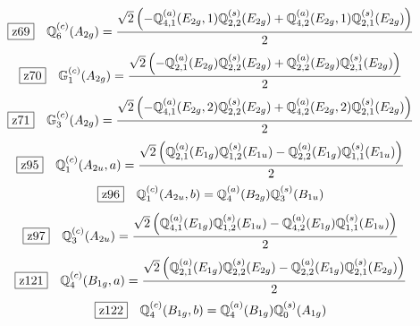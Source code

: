 \documentclass[fleqn,10pt,landscape]{jsarticle}
\begin{document}
\begin{dmath*}
\hspace*{3mm}\fbox{z69}\quad \mathbb{Q}_{6}^{(c)}(A_{2g})=\frac{\sqrt{2} \left(- \mathbb{Q}_{4,1}^{(a)}(E_{2g},1) \mathbb{Q}_{2,2}^{(s)}(E_{2g}) + \mathbb{Q}_{4,2}^{(a)}(E_{2g},1) \mathbb{Q}_{2,1}^{(s)}(E_{2g})\right)}{2}
\end{dmath*}
\begin{dmath*}
\hspace*{3mm}\fbox{z70}\quad \mathbb{G}_{1}^{(c)}(A_{2g})=\frac{\sqrt{2} \left(- \mathbb{Q}_{2,1}^{(a)}(E_{2g}) \mathbb{Q}_{2,2}^{(s)}(E_{2g}) + \mathbb{Q}_{2,2}^{(a)}(E_{2g}) \mathbb{Q}_{2,1}^{(s)}(E_{2g})\right)}{2}
\end{dmath*}
\begin{dmath*}
\hspace*{3mm}\fbox{z71}\quad \mathbb{G}_{3}^{(c)}(A_{2g})=\frac{\sqrt{2} \left(- \mathbb{Q}_{4,1}^{(a)}(E_{2g},2) \mathbb{Q}_{2,2}^{(s)}(E_{2g}) + \mathbb{Q}_{4,2}^{(a)}(E_{2g},2) \mathbb{Q}_{2,1}^{(s)}(E_{2g})\right)}{2}
\end{dmath*}
\begin{dmath*}
\hspace*{3mm}\fbox{z95}\quad \mathbb{Q}_{1}^{(c)}(A_{2u},a)=\frac{\sqrt{2} \left(\mathbb{Q}_{2,1}^{(a)}(E_{1g}) \mathbb{Q}_{1,2}^{(s)}(E_{1u}) - \mathbb{Q}_{2,2}^{(a)}(E_{1g}) \mathbb{Q}_{1,1}^{(s)}(E_{1u})\right)}{2}
\end{dmath*}
\begin{dmath*}
\hspace*{3mm}\fbox{z96}\quad \mathbb{Q}_{1}^{(c)}(A_{2u},b)=\mathbb{Q}_{4}^{(a)}(B_{2g}) \mathbb{Q}_{3}^{(s)}(B_{1u})
\end{dmath*}
\begin{dmath*}
\hspace*{3mm}\fbox{z97}\quad \mathbb{Q}_{3}^{(c)}(A_{2u})=\frac{\sqrt{2} \left(\mathbb{Q}_{4,1}^{(a)}(E_{1g}) \mathbb{Q}_{1,2}^{(s)}(E_{1u}) - \mathbb{Q}_{4,2}^{(a)}(E_{1g}) \mathbb{Q}_{1,1}^{(s)}(E_{1u})\right)}{2}
\end{dmath*}
\begin{dmath*}
\hspace*{3mm}\fbox{z121}\quad \mathbb{Q}_{4}^{(c)}(B_{1g},a)=\frac{\sqrt{2} \left(\mathbb{Q}_{2,1}^{(a)}(E_{1g}) \mathbb{Q}_{2,2}^{(s)}(E_{2g}) - \mathbb{Q}_{2,2}^{(a)}(E_{1g}) \mathbb{Q}_{2,1}^{(s)}(E_{2g})\right)}{2}
\end{dmath*}
\begin{dmath*}
\hspace*{3mm}\fbox{z122}\quad \mathbb{Q}_{4}^{(c)}(B_{1g},b)=\mathbb{Q}_{4}^{(a)}(B_{1g}) \mathbb{Q}_{0}^{(s)}(A_{1g})
\end{dmath*}
\end{document}
